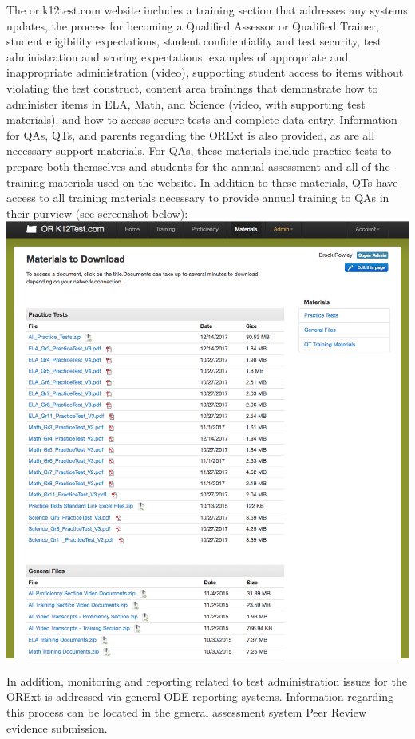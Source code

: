 \documentclass[]{article}
\begin{document}
The or.k12test.com website includes a training section that addresses
any systems updates, the process for becoming a Qualified Assessor or
Qualified Trainer, student eligibility expectations, student
confidentiality and test security, test administration and scoring
expectations, examples of appropriate and inappropriate administration
(video), supporting student access to items without violating the test
construct, content area trainings that demonstrate how to administer
items in ELA, Math, and Science (video, with supporting test materials),
and how to access secure tests and complete data entry. Information for
QAs, QTs, and parents regarding the ORExt is also provided, as are all
necessary support materials. For QAs, these materials include practice
tests to prepare both themselves and students for the annual assessment
and all of the training materials used on the website. In addition to
these materials, QTs have access to all training materials necessary to
provide annual training to QAs in their purview (see screenshot below):
\FloatBarrier
\includegraphics{Figures/TrainingSite/Downloads.png}

In addition, monitoring and reporting related to test administration
issues for the ORExt is addressed via general ODE reporting systems.
Information regarding this process can be located in the general
assessment system Peer Review evidence submission.
\end{document}
